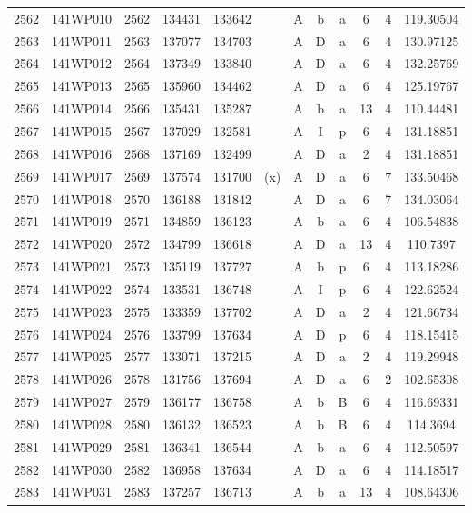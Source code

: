 \begin{tabular}{|*{12}{c|}}
2562 & 141WP010 & 2562 & 134431 & 133642 &  & A & b & a & 6 & 4 & 119.30504 \\ 
2563 & 141WP011 & 2563 & 137077 & 134703 &  & A & D & a & 6 & 4 & 130.97125 \\ 
2564 & 141WP012 & 2564 & 137349 & 133840 &  & A & D & a & 6 & 4 & 132.25769 \\ 
2565 & 141WP013 & 2565 & 135960 & 134462 &  & A & D & a & 6 & 4 & 125.19767 \\ 
2566 & 141WP014 & 2566 & 135431 & 135287 &  & A & b & a & 13 & 4 & 110.44481 \\ 
2567 & 141WP015 & 2567 & 137029 & 132581 &  & A & I & p & 6 & 4 & 131.18851 \\ 
2568 & 141WP016 & 2568 & 137169 & 132499 &  & A & D & a & 2 & 4 & 131.18851 \\ 
2569 & 141WP017 & 2569 & 137574 & 131700 & (x) & A & D & a & 6 & 7 & 133.50468 \\ 
2570 & 141WP018 & 2570 & 136188 & 131842 &  & A & D & a & 6 & 7 & 134.03064 \\ 
2571 & 141WP019 & 2571 & 134859 & 136123 &  & A & b & a & 6 & 4 & 106.54838 \\ 
2572 & 141WP020 & 2572 & 134799 & 136618 &  & A & D & a & 13 & 4 & 110.7397 \\ 
2573 & 141WP021 & 2573 & 135119 & 137727 &  & A & b & p & 6 & 4 & 113.18286 \\ 
2574 & 141WP022 & 2574 & 133531 & 136748 &  & A & I & p & 6 & 4 & 122.62524 \\ 
2575 & 141WP023 & 2575 & 133359 & 137702 &  & A & D & a & 2 & 4 & 121.66734 \\ 
2576 & 141WP024 & 2576 & 133799 & 137634 &  & A & D & p & 6 & 4 & 118.15415 \\ 
2577 & 141WP025 & 2577 & 133071 & 137215 &  & A & D & a & 2 & 4 & 119.29948 \\ 
2578 & 141WP026 & 2578 & 131756 & 137694 &  & A & D & a & 6 & 2 & 102.65308 \\ 
2579 & 141WP027 & 2579 & 136177 & 136758 &  & A & b & B & 6 & 4 & 116.69331 \\ 
2580 & 141WP028 & 2580 & 136132 & 136523 &  & A & b & B & 6 & 4 & 114.3694 \\ 
2581 & 141WP029 & 2581 & 136341 & 136544 &  & A & b & a & 6 & 4 & 112.50597 \\ 
2582 & 141WP030 & 2582 & 136958 & 137634 &  & A & D & a & 6 & 4 & 114.18517 \\ 
2583 & 141WP031 & 2583 & 137257 & 136713 &  & A & b & a & 13 & 4 & 108.64306 \\ 

\end{tabular}
